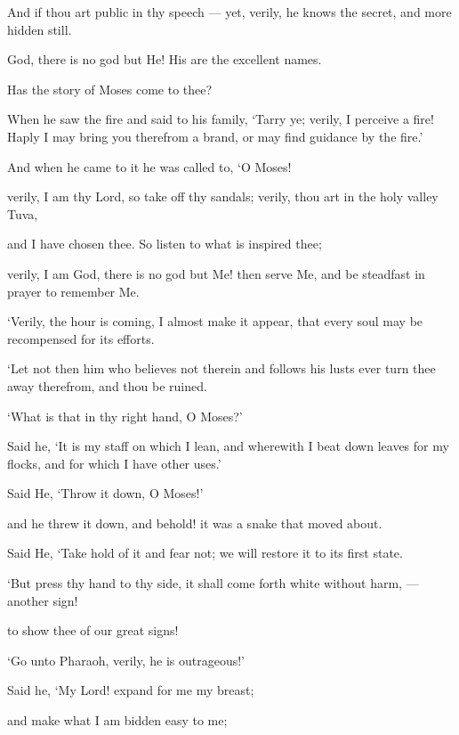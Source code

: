 \documentclass[fontsize=14pt, letterpaper, notitlepage, openany, DIV=12]{scrbook} %
\begin{document}
\noindent[20:7]
And if thou art public in thy speech --- yet, verily, he knows the secret, and more hidden
still.

\noindent[20:8]
God, there is no god but He! His are the excellent names.

\noindent[20:9]
Has the story of Moses come to thee?

\noindent[20:10]
When he saw the fire and said to his family, `Tarry ye; verily, I perceive a fire! Haply I
may bring you therefrom a brand, or may find guidance by the fire.'

\noindent[20:11]
And when he came to it he was called to, `O Moses!

\noindent[20:12]
verily, I am thy Lord, so take off thy sandals; verily, thou art in the holy valley Tuva,

\noindent[20:13]
and I have chosen thee. So listen to what is inspired thee;

\noindent[20:14]
verily, I am God, there is no god but Me! then serve Me, and be steadfast in prayer to
remember Me.

\noindent[20:15]
`Verily, the hour is coming, I almost make it appear, that every soul may be recompensed
for its efforts.

\noindent[20:16]
`Let not then him who believes not therein and follows his lusts ever turn thee away
therefrom, and thou be ruined.

\noindent[20:17]
`What is that in thy right hand, O Moses?'

\noindent[20:18]
Said he, `It is my staff on which I lean, and wherewith I beat down leaves for my flocks,
and for which I have other uses.'

\noindent[20:19]
Said He, `Throw it down, O Moses!'

\noindent[20:20]
and he threw it down, and behold! it was a snake that moved about.

\noindent[20:21]
Said He, `Take hold of it and fear not; we will restore it to its first state.

\noindent[20:22]
`But press thy hand to thy side, it shall come forth white without harm, --- another sign!

\noindent[20:23]
to show thee of our great signs!

\noindent[20:24]
`Go unto Pharaoh, verily, he is outrageous!'

\noindent[20:25]
Said he, `My Lord! expand for me my breast;

\noindent[20:26]
and make what I am bidden easy to me;
\end{document}

